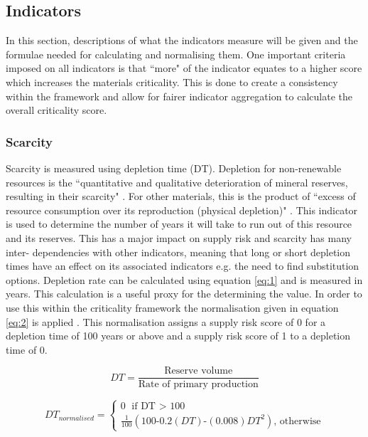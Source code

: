 \documentclass{article}
\begin{document}
\subsection{Indicators}
In this section, descriptions of what the indicators measure will be given and the formulae needed for calculating and normalising them. One important criteria imposed on all indicators is that ``more" of the indicator equates to a higher score which increases the materials criticality. This is done to create a consistency within the framework and allow for fairer indicator aggregation to calculate the overall criticality score.

\subsubsection{Scarcity}

Scarcity is measured using depletion time (DT). Depletion for non-renewable resources is the ``quantitative and qualitative deterioration of mineral reserves, resulting in their scarcity" \cite{su13020862}. For other materials, this is the product of ``excess of resource consumption over its reproduction (physical depletion)" \cite{SANTOPIETRO199839}. This indicator is used to determine the number of years it will take to run out of this resource and its reserves. This has a major impact on supply risk and scarcity has many inter- dependencies with other indicators, meaning that long or short depletion times have an effect on its associated indicators e.g. the need to find substitution options. Depletion rate can be calculated using equation \ref{eq:1} and is measured in years. This calculation is a useful proxy for the determining the value. In order to use this within the criticality framework the normalisation given in equation \ref{eq:2} is applied \cite{doi:10.1021/es203534z}. This normalisation assigns a supply risk score of 0 for a depletion time of 100 years or above and a supply risk score of 1 to a depletion time of 0.


\begin{equation} \label{eq:1}
DT = \frac{\text{Reserve volume}}{\text{Rate of primary production}}
\end{equation}

\begin{equation} \label{eq:2}
DT_{normalised} = \left\{\begin{matrix} 0 \text{ if DT $>$ 100}
\\\frac{1}{100} (100\text{-}0.2(DT)\text{-}(0.008)DT^2) \text{, otherwise}

\end{matrix}\right.
\end{equation}
\end{document}

